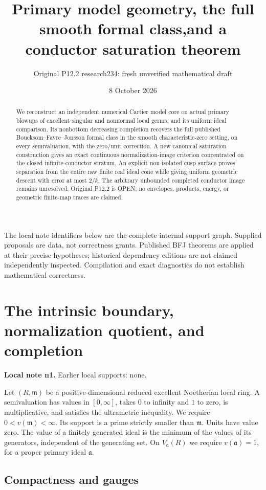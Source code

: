 \documentclass[11pt]{article}
\title{Primary model geometry, the full smooth formal class,\linebreak and a conductor saturation theorem}
\author{Original P12.2 research234: fresh unverified mathematical draft}
\date{8 October 2026}
\begin{document}
\maketitle
\begin{abstract}
We reconstruct an independent numerical Cartier model core on actual primary blowups of excellent singular and nonnormal local germs, and its uniform ideal comparison. Its nonbottom decreasing completion recovers the full published Boucksom--Favre--Jonsson formal class in the smooth characteristic-zero setting, on every semivaluation, with the zero/unit correction. A new canonical saturation construction gives an exact continuous normalization-image criterion concentrated on the closed infinite-conductor stratum. An explicit non-isolated cusp surface proves separation from the entire raw finite real ideal cone while giving uniform geometric descent with error at most $2/k$. The arbitrary unbounded completed conductor image remains unresolved. Original P12.2 is OPEN; no envelopes, products, energy, or geometric finite-map traces are claimed.
\end{abstract}
\tableofcontents
\bigskip
\noindent The local note identifiers below are the complete internal support graph. Supplied proposals are data, not correctness grants. Published BFJ theorems are applied at their precise hypotheses; historical dependency editions are not claimed independently inspected. Compilation and exact diagnostics do not establish mathematical correctness.
\section{The intrinsic boundary, normalization quotient, and completion}
\label{sec:n1}
\noindent\textbf{Local note n1.} Earlier local supports: none.

Let $(R,\mathfrak m)$ be a positive-dimensional reduced excellent Noetherian local ring. A semivaluation has values in $[0,\infty]$, takes $0$ to infinity and $1$ to zero, is multiplicative, and satisfies the ultrametric inequality. We require $0<v(\mathfrak m)<\infty$. Its support is a prime strictly smaller than $\mathfrak m$. Units have value zero. The value of a finitely generated ideal is the minimum of the values of its generators, independent of the generating set. On $V_{\mathfrak a}(R)$ we require $v(\mathfrak a)=1$, for a proper primary ideal $\mathfrak a$.

\subsection{Compactness and gauges}
\end{document}
